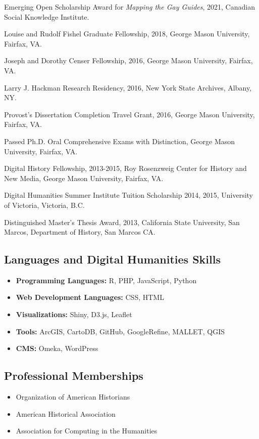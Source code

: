 \documentclass[11pt]{article}
\begin{document}
Emerging Open Scholarship Award for \emph{Mapping the Gay Guides}, 2021, Canadian Social Knowledge Institute.

Louise and Rudolf Fishel Graduate Fellowship, 2018, George Mason University, Fairfax, VA.

Joseph and Dorothy Censer Fellowship, 2016, George Mason University, Fairfax, VA.

Larry J. Hackman Research Residency, 2016, New York State Archives, Albany, NY.

Provost's Dissertation Completion Travel Grant, 2016, George Mason University, Fairfax, VA.

Passed Ph.D. Oral Comprehensive Exams with Distinction, George Mason University, Fairfax, VA.

Digital History Fellowship, 2013-2015, Roy Rosenzweig Center for History and New Media, George Mason University, Fairfax, VA.

Digital Humanities Summer Institute Tuition Scholarship 2014, 2015, University of Victoria, Victoria, B.C.

Distinguished Master's Thesis Award, 2013, California State University, San Marcos, Department of History, San Marcos CA.


\subsection{Languages and Digital Humanities Skills}
\begin{itemize}
  \itemsep0em 
  \item\textbf{Programming Languages:} R, PHP, JavaScript, Python
  \item\textbf{Web Development Languages:} CSS, HTML
  \item\textbf{Visualizations:} Shiny, D3.js, Leaflet
  \item\textbf{Tools:} ArcGIS, CartoDB, GitHub, GoogleRefine, MALLET, QGIS
  \item\textbf{CMS:} Omeka, WordPress
\end{itemize}

\subsection{Professional Memberships}
\begin{itemize}
  \itemsep0em 
  \item{Organization of American Historians}
  \item{American Historical Association}
  \item{Association for Computing in the Humanities}
\end{itemize}
\end{document}
